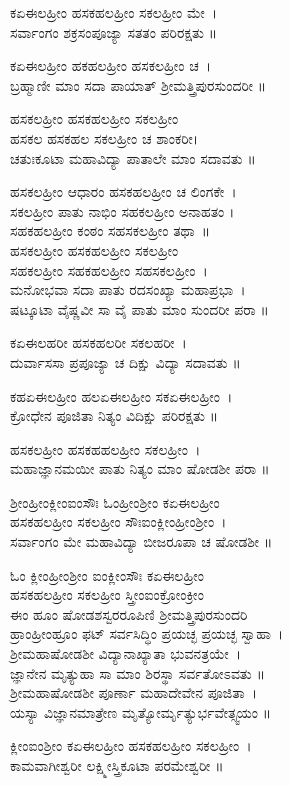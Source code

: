ಕಏಈಲಹ್ರೀಂ ಹಸಕಹಲಹ್ರೀಂ ಸಕಲಹ್ರೀಂ ಮೇ~।\\
ಸರ್ವಾಂಗಂ ಶಕ್ರಸಂಪೂಜ್ಯಾ ಸತತಂ ಪರಿರಕ್ಷತು ॥

ಕಏಈಲಹ್ರೀಂ ಹಕಹಲಹ್ರೀಂ ಹಸಕಲಹ್ರೀಂ ಚ~।\\
ಬ್ರಹ್ಮಾಣೀ ಮಾಂ ಸದಾ ಪಾಯಾತ್ ಶ್ರೀಮತ್ತ್ರಿಪುರಸುಂದರೀ ॥

ಹಸಕಲಹ್ರೀಂ ಹಸಕಹಲಹ್ರೀಂ ಸಕಲಹ್ರೀಂ \\ಹಸಕಲ ಹಸಕಹಲ ಸಕಲಹ್ರೀಂ ಚ ಶಾಂಕರೀ।\\
ಚತುಃಕೂಟಾ ಮಹಾವಿದ್ಯಾ ಪಾತಾಲೇ ಮಾಂ ಸದಾವತು ॥

ಹಸಕಲಹ್ರೀಂ ಆಧಾರಂ ಹಸಕಹಲಹ್ರೀಂ ಚ ಲಿಂಗಕೇ~।\\
ಸಕಲಹ್ರೀಂ ಪಾತು ನಾಭಿಂ ಸಹಕಲಹ್ರೀಂ ಅನಾಹತಂ ।\\
ಸಹಕಹಲಹ್ರೀಂ ಕಂಠಂ ಸಹಸಕಲಹ್ರೀಂ ತಥಾ~॥\\
ಹಸಕಲಹ್ರೀಂ ಹಸಕಹಲಹ್ರೀಂ ಸಕಲಹ್ರೀಂ \\ಸಹಕಲಹ್ರೀಂ ಸಹಕಹಲಹ್ರೀಂ ಸಹಸಕಲಹ್ರೀಂ~।\\
ಮನೋಭವಾ ಸದಾ ಪಾತು ರದಸಂಖ್ಯಾ ಮಹಾಪ್ರಭಾ~।\\
ಷಟ್ಕೂಟಾ ವೈಷ್ಣವೀ ಸಾ ವೈ ಪಾತು ಮಾಂ ಸುಂದರೀ ಪರಾ ॥

ಕಏಈಲಹರೀ ಹಸಕಹಲರೀ ಸಕಲಹರೀ~।\\
ದುರ್ವಾಸಸಾ ಪ್ರಪೂಜ್ಯಾ ಚ ದಿಕ್ಷು ವಿದ್ಯಾ ಸದಾವತು ॥

ಕಹಏಈಲಹ್ರೀಂ ಹಲಏಈಲಹ್ರೀಂ ಸಕಏಈಲಹ್ರೀಂ~।\\
ಕ್ರೋಧೇನ ಪೂಜಿತಾ ನಿತ್ಯಂ ವಿದಿಕ್ಷು ಪರಿರಕ್ಷತು ॥

ಹಸಕಲಹ್ರೀಂ ಹಸಕಹಹಲಹ್ರೀಂ ಸಕಲಹ್ರೀಂ~।\\
ಮಹಾಜ್ಞಾನಮಯೀ ಪಾತು ನಿತ್ಯಂ ಮಾಂ ಷೋಡಶೀ ಪರಾ ॥

ಶ್ರೀಂಹ್ರೀಂಕ್ಲೀಂಐಂಸೌಃ ಓಂಹ್ರೀಂಶ್ರೀಂ ಕಏಈಲಹ್ರೀಂ\\ ಹಸಕಹಲಹ್ರೀಂ ಸಕಲಹ್ರೀಂ ಸೌಃಐಂಕ್ಲೀಂಹ್ರೀಂಶ್ರೀಂ~।\\
ಸರ್ವಾಂಗಂ ಮೇ ಮಹಾವಿದ್ಯಾ ಬೀಜರೂಪಾ ಚ ಷೋಡಶೀ ॥

ಓಂ ಕ್ಲೀಂಹ್ರೀಂಶ್ರೀಂ ಐಂಕ್ಲೀಂಸೌಃ ಕಏಈಲಹ್ರೀಂ\\ಹಸಕಹಲಹ್ರೀಂ ಸಕಲಹ್ರೀಂ ಸ್ತ್ರೀಂಐಂಕ್ರೋಂಕ್ರೀಂ \\ಈಂ ಹೂಂ ಷೋಡಶಸ್ವರರೂಪಿಣಿ  ಶ್ರೀಮತ್ತ್ರಿಪುರಸುಂದರಿ \\ಹ್ರಾಂಹ್ರೀಂಹ್ರೂಂ ಫಟ್ ಸರ್ವಸಿದ್ಧಿಂ ಪ್ರಯಚ್ಛ ಪ್ರಯಚ್ಛ ಸ್ವಾಹಾ~।\\
ಶ್ರೀಮಹಾಷೋಡಶೀ ವಿದ್ಯಾನಾಖ್ಯಾತಾ ಭುವನತ್ರಯೇ~।\\
ಜ್ಞಾನೇನ ಮೃತ್ಯುಹಾ ಸಾ ಮಾಂ ಶಿರಸ್ಥಾ ಸರ್ವತೋಽವತು ॥\\
ಶ್ರೀಮಹಾಷೋಡಶೀ ಪೂರ್ಣಾ ಮಹಾದೇವೇನ ಪೂಜಿತಾ~।\\
ಯಸ್ಯಾ ವಿಜ್ಞಾನಮಾತ್ರೇಣ ಮೃತ್ಯೋರ್ಮೃತ್ಯುರ್ಭವೇತ್ಸ್ವಯಂ ॥

ಕ್ಲೀಂಐಂಶ್ರೀಂ ಕಏಈಲಹ್ರೀಂ ಹಸಕಹಲಹ್ರೀಂ ಸಕಲಹ್ರೀಂ~।\\
ಕಾಮವಾಗೀಶ್ವರೀ ಲಕ್ಷ್ಮೀಸ್ತ್ರಿಕೂಟಾ ಪರಮೇಶ್ವರೀ ॥

